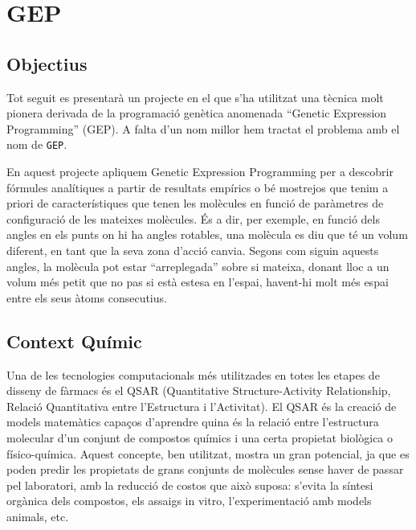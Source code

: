 

%

\chapter{GEP} %
\label{cha:GEP}

\section{Objectius} %
\label{sec:Introduccio}
Tot seguit es presentarà un projecte en el que s'ha utilitzat una tècnica
molt pionera derivada de la programació genètica anomenada ``Genetic
Expression Programming'' (GEP).  A falta d'un nom millor hem tractat el
problema amb el nom de \texttt{GEP}.

En aquest projecte apliquem Genetic Expression Programming per a descobrir
fórmules analítiques a partir de resultats empírics o bé mostrejos que tenim
a priori de característiques que tenen les molècules en funció de paràmetres
de configuració de les mateixes molècules.  És a dir, per exemple, en funció
dels angles en els punts on hi ha angles rotables, una molècula es diu que
té un volum diferent, en tant que la seva zona d'acció canvia.  Segons com
siguin aquests angles, la molècula pot estar ``arreplegada'' sobre si
mateixa, donant lloc a un volum més petit que no pas si està estesa en
l'espai, havent-hi molt més espai entre els seus àtoms consecutius.


\section{Context Químic} %
\label{sec:Context Quimic}

%
Una de les tecnologies computacionals més utilitzades en totes les etapes de
disseny de fàrmacs és el QSAR (Quantitative Structure-Activity Relationship,
Relació Quantitativa entre l’Estructura i l’Activitat). El QSAR és la creació de
models matemàtics capaços d’aprendre quina és la relació entre l’estructura
molecular d’un conjunt de compostos químics i una certa propietat biològica o
físico-química. Aquest concepte, ben utilitzat, mostra un gran potencial, ja que
es poden predir les propietats de grans conjunts de molècules sense haver de
passar pel laboratori, amb la reducció de costos que això suposa: s’evita la
síntesi orgànica dels compostos, els assaigs in vitro, l’experimentació amb
models animals, etc.

